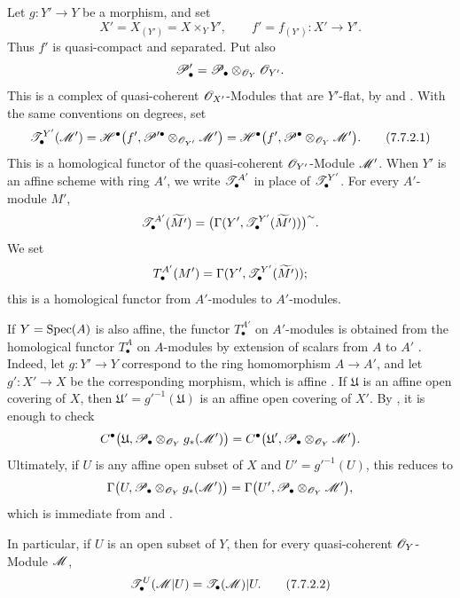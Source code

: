 \begin{env}[7.7.2]
\label{III.7.7.2}
Let $g:Y'\to Y$ be a morphism, and set
\[
  X'=X_{(Y')}=X\times_Y Y',
  \qquad
  f'=f_{(Y')}:X'\longrightarrow Y'.
\]
Thus $f'$ is quasi-compact and separated.  Put also
\[
  \mathscr{P}'_\bullet
  =\mathscr{P}_\bullet\otimes_{\mathscr{O}_Y}\mathscr{O}_{Y'}.
\]
This is a complex of quasi-coherent $\mathscr{O}_{X'}$-Modules
that are $Y'$-flat, by  and
.  With the same conventions on degrees, set
\[
  \sh{T}^{Y'}_\bullet(\sh{M}')
  =
  \mathscr{H}^\bullet
    \bigl(f',
      \sh{P}'^\bullet\otimes_{\sh{O}_{Y'}}\sh{M}'\bigr)
  =
  \mathscr{H}^\bullet
    \bigl(f',
      \sh{P}^\bullet\otimes_{\sh{O}_Y}\sh{M}'\bigr).
  \tag{7.7.2.1}\label{III.7.7.2.1}
\]
This is a homological functor of the quasi-coherent
$\mathscr{O}_{Y'}$-Module $\mathscr{M}'$.  When $Y'$ is an affine
scheme with ring $A'$, we write $\mathscr{T}^{A'}_\bullet$ in
place of $\mathscr{T}^{Y'}_\bullet$.  For every $A'$-module $M'$,
\[
  \mathscr{T}^{A'}_\bullet(\widetilde{M'})
  =
  \bigl(
    \Gamma(Y',
      \mathscr{T}^{Y'}_\bullet(\widetilde{M'}))
  \bigr)^\sim.
\]
We set
\[
  T^{A'}_\bullet(M')
  =
  \Gamma(Y',
    \mathscr{T}^{Y'}_\bullet(\widetilde{M'}));
\]
this is a homological functor from $A'$-modules to
$A'$-modules.

If $Y=\operatorname{Spec}(A)$ is also affine, the functor
$T^{A'}_\bullet$ on $A'$-modules is obtained from the
homological functor $T^A_\bullet$ on $A$-modules by extension
of scalars from $A$ to $A'$ .  Indeed, let
$g:Y'\to Y$ correspond to the ring homomorphism $A\to A'$,
and let $g':X'\to X$ be the corresponding morphism, which is
affine .  If $\mathfrak U$ is an affine
open covering of $X$, then
$\mathfrak U'=g'^{-1}(\mathfrak U)$ is an affine open
covering of $X'$.  By , it is enough to check
\[
  C^\bullet
  \bigl(\mathfrak U,
    \mathscr{P}_\bullet\otimes_{\mathscr{O}_Y}g_*(\mathscr{M}')\bigr)
  =
  C^\bullet
  \bigl(\mathfrak U',
    \mathscr{P}_\bullet\otimes_{\mathscr{O}_Y}\mathscr{M}'\bigr).
\]
Ultimately, if $U$ is any affine open subset of $X$ and
$U'=g'^{-1}(U)$, this reduces to
\[
  \Gamma
  \bigl(U,
    \mathscr{P}_\bullet\otimes_{\mathscr{O}_Y}g_*(\mathscr{M}')\bigr)
  =
  \Gamma
  \bigl(U',
    \mathscr{P}_\bullet\otimes_{\mathscr{O}_Y}\mathscr{M}'\bigr),
\]
which is immediate from  and .

In particular, if $U$ is an open subset of $Y$, then for
every quasi-coherent $\mathscr{O}_Y$-Module $\mathscr{M}$,
\[
  \sh{T}^U_\bullet(\sh{M}|U)
  =
  \sh{T}_\bullet(\sh{M})|U.
  \tag{7.7.2.2}\label{III.7.7.2.2}
\]
\end{env}

